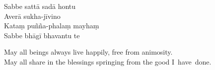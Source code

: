 \enlargethispage{\baselineskip}


\begin{paritta}
Sabbe sattā sadā hontu\\
Averā sukha-jīvino\\
Kataṃ puñña-phalaṃ mayhaṃ\\
Sabbe bhāgī bhavantu te
\end{paritta}

\begin{english}
  May all beings always live happily, free from animosity.\\
  May all share in the blessings springing from the good I~have~done.
\end{english}

